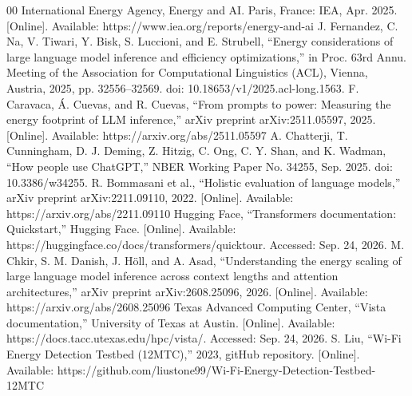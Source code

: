 \documentclass[conference]{IEEEtran}
\begin{document}
\begin{thebibliography}{00}
 International Energy Agency, Energy and AI. Paris, France: IEA, Apr. 2025. [Online]. Available: https://www.iea.org/reports/energy-and-ai
 J. Fernandez, C. Na, V. Tiwari, Y. Bisk, S. Luccioni, and E. Strubell, “Energy considerations of large language model inference and efficiency optimizations,” in Proc. 63rd Annu. Meeting of the Association for Computational Linguistics (ACL), Vienna, Austria, 2025, pp. 32556–32569. doi: 10.18653/v1/2025.acl-long.1563.
 F. Caravaca, Á. Cuevas, and R. Cuevas, “From prompts to power: Measuring the energy footprint of LLM inference,” arXiv preprint arXiv:2511.05597, 2025. [Online]. Available: https://arxiv.org/abs/2511.05597
 A. Chatterji, T. Cunningham, D. J. Deming, Z. Hitzig, C. Ong, C. Y. Shan, and K. Wadman, “How people use ChatGPT,” NBER Working Paper No. 34255, Sep. 2025. doi: 10.3386/w34255.
 R. Bommasani et al., “Holistic evaluation of language models,” arXiv preprint arXiv:2211.09110, 2022. [Online]. Available: https://arxiv.org/abs/2211.09110
 Hugging Face, “Transformers documentation: Quickstart,” Hugging Face. [Online]. Available: https://huggingface.co/docs/transformers/quicktour. Accessed: Sep. 24, 2026.
 M. Chkir, S. M. Danish, J. Höll, and A. Asad, “Understanding the energy scaling of large language model inference across context lengths and attention architectures,” arXiv preprint arXiv:2608.25096, 2026. [Online]. Available: https://arxiv.org/abs/2608.25096
 Texas Advanced Computing Center, “Vista documentation,” University of Texas at Austin. [Online]. Available: https://docs.tacc.utexas.edu/hpc/vista/. Accessed: Sep. 24, 2026.
 S. Liu, ``Wi-Fi Energy Detection Testbed (12MTC),'' 2023, gitHub repository. [Online]. Available: https://github.com/liustone99/Wi-Fi-Energy-Detection-Testbed-12MTC
\end{thebibliography}
\end{document}
